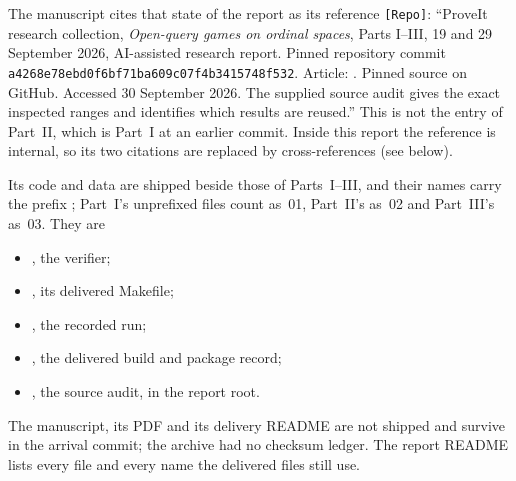 \documentclass[11pt,letterpaper]{article}
\numberwithin{equation}{section}
\theoremstyle{definition}
\theoremstyle{remark}
\theoremstyle{definition}
\begin{document}
The manuscript cites that state of the report as its reference
\texttt{[Repo]}: ``ProveIt research collection, \emph{Open-query games on
ordinal spaces}, Parts I--III, 19 and 29 September 2026, AI-assisted research
report. Pinned repository commit
\texttt{a4268e78ebd0f6bf71ba609c07f4b3415748f532}. Article:
.
Pinned source on GitHub. Accessed 30 September 2026. The supplied source audit
gives the exact inspected ranges and identifies which results are reused.''
This is not the entry \cite{Repo} of Part~II, which is Part~I at an earlier
commit. Inside this report the reference is internal, so its two citations
are replaced by cross-references (see below).

Its code and data are shipped beside those of Parts~I--III, and their names
carry the prefix ; Part~I's unprefixed files count
as~01, Part~II's as~02 and Part~III's as~03. They are
\begin{itemize}
\item {}, the verifier;
\item {}, its delivered Makefile;
\item {}, the recorded run;
\item {}, the delivered build and
package record;
\item {}, the source audit, in the report root.
\end{itemize}
The manuscript, its PDF and its delivery README are not
shipped and survive in the arrival commit; the archive had no checksum
ledger. The report README lists every file and every name the delivered files
still use.
\end{document}
